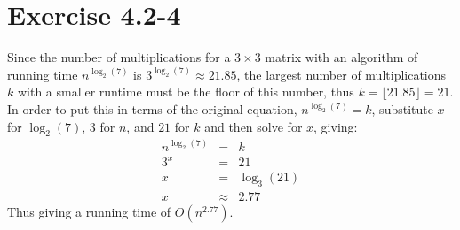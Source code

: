 \documentclass{article}
\begin{document}
\section*{Exercise 4.2-4}

Since the number of multiplications for a $3 \times 3$ matrix with an algorithm of running time $n^{\log_2(7)}$ is $3^{\log_2(7)} \approx 21.85$, the largest number of multiplications $k$ with a smaller runtime must be the floor of this number, thus $k = \lfloor 21.85 \rfloor = 21$. In order to put this in terms of the original equation, $n^{\log_2(7)} = k$, substitute $x$ for $\log_2(7)$, $3$ for $n$, and $21$ for $k$ and then solve for $x$, giving:
\begin{eqnarray*}
	n^{\log_2(7)} &=& k \\
	3^x &=& 21 \\
	x &=& \log_3(21) \\
	x &\approx& 2.77
\end{eqnarray*}
Thus giving a running time of $O(n^{2.77})$.
\end{document}
